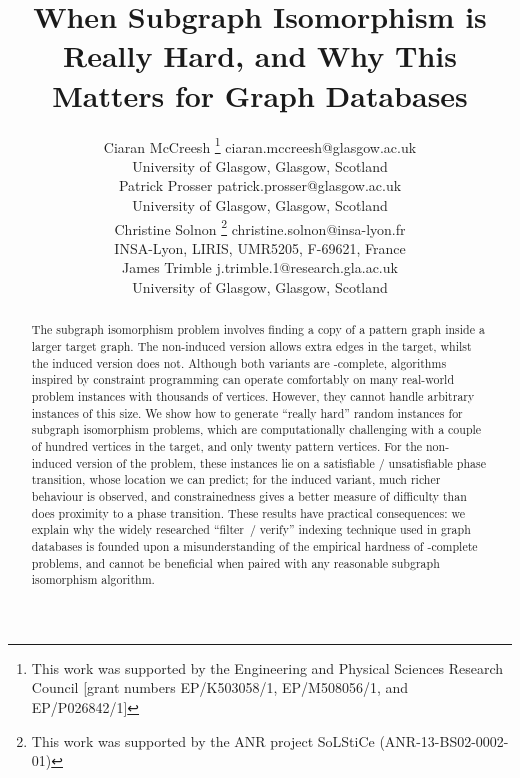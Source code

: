 \documentclass[twoside,11pt]{article}
\newcommand*\samethanks[1][\value{footnote}]{\footnotemark[#1]}
\begin{document}
\title{When Subgraph Isomorphism is Really Hard, and Why This Matters for Graph
Databases}

\author{\name Ciaran McCreesh \thanks{This work was supported by the Engineering and Physical Sciences
           Research Council [grant numbers EP/K503058/1, EP/M508056/1, and EP/P026842/1]} \email
           ciaran.mccreesh@glasgow.ac.uk \\
       \addr University of Glasgow, Glasgow, Scotland \\
       \name Patrick Prosser \samethanks[1] \email patrick.prosser@glasgow.ac.uk \\
       \addr University of Glasgow, Glasgow, Scotland \\
       \name Christine Solnon \thanks{This work was supported
       by the ANR project SoLStiCe (ANR-13-BS02-0002-01)} \email christine.solnon@insa-lyon.fr \\
       \addr INSA-Lyon, LIRIS, UMR5205, F-69621, France \\
       \name James Trimble \samethanks[1] \email j.trimble.1@research.gla.ac.uk \\
       \addr University of Glasgow, Glasgow, Scotland}
\maketitle

\begin{abstract}
    The subgraph isomorphism problem involves finding a copy of a pattern graph inside a larger
    target graph. The non-induced version allows extra edges in the target, whilst the induced
    version does not.  Although both variants are \NP-complete, algorithms inspired by constraint programming
    can operate comfortably on many real-world problem instances with thousands of vertices.
    However, they cannot handle arbitrary instances of this size. We show how to generate ``really
    hard'' random instances for subgraph isomorphism problems, which are computationally challenging
    with a couple of hundred vertices in the target, and only twenty pattern vertices. For the
    non-induced version of the problem, these instances lie on a satisfiable / unsatisfiable phase
    transition, whose location we can predict; for the induced variant, much richer behaviour is
    observed, and constrainedness gives a better measure of difficulty than does proximity to a
    phase transition.  These results have practical consequences: we explain why the widely
    researched ``filter~/ verify'' indexing technique used in graph databases is founded upon a
    misunderstanding of the empirical hardness of \NP-complete problems, and cannot be beneficial
    when paired with any reasonable subgraph isomorphism algorithm.
\end{abstract}
\end{document}
